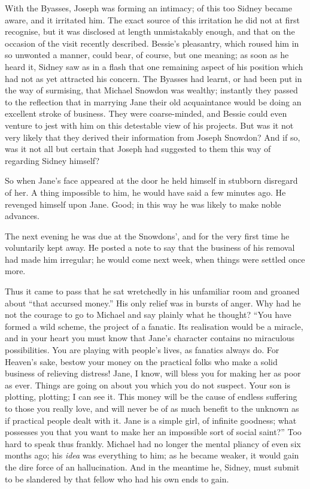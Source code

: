 With the Byasses, Joseph was forming an {}intimacy; of this too Sidney
became aware, and it irritated him. The exact source of this irritation
he did not at first recognise, but it was disclosed at length
unmistakably enough, and that on the occasion of the visit recently
described. Bessie's pleasantry, which roused him in so unwonted a
manner, could bear, of course, but one meaning; as soon as he heard it,
Sidney saw as in a flash that one remaining aspect of his position which
had not as yet attracted his concern. The Byasses had learnt, or had
been put in the way of surmising, that Michael Snowdon was wealthy;
instantly they passed to the reflection that in marrying Jane their old
acquaintance would be doing an excellent stroke of business. They were
coarse-minded, and Bessie could even venture to jest with him on this
detestable view of his projects. But was it not very likely that they
derived their information from Joseph Snowdon? And if so, was it not all
but certain that Joseph had suggested to them this way of regarding
Sidney himself?

{}So when Jane's face appeared at the door he held himself in stubborn
disregard of her. A thing impossible to him, he would have said a few
minutes ago. He revenged himself upon Jane. Good; in this way he was
likely to make noble advances.

The next evening he was due at the Snowdons', and for the very first
time he voluntarily kept away. He posted a note to say that the business
of his removal had made him irregular; he would come next week, when
things were settled once more.

Thus it came to pass that he sat wretchedly in his unfamiliar room and
groaned about ``that accursed money.'' His only relief was in bursts of
anger. Why had he not the courage to go to Michael and say plainly what
he thought? ``You have formed a wild scheme, the project of a fanatic.
Its realisation would be a miracle, and in your heart you must know that
Jane's character contains no miraculous possibilities. You are playing
with people's lives, as fanatics always do. For Heaven's sake, bestow
your money on the {}practical folks who make a solid business of
relieving distress! Jane, I know, will bless you for making her as poor
as ever. Things are going on about you which you do not suspect. Your
son is plotting, plotting; I can see it. This money will be the cause of
endless suffering to those you really love, and will never be of as much
benefit to the unknown as if practical people dealt with it. Jane is a
simple girl, of infinite goodness; what possesses you that you want to
make her an impossible sort of social saint?'' Too hard to speak thus
frankly. Michael had no longer the mental pliancy of even six months
ago; his \emph{idea} was everything to him; as he became weaker, it
would gain the dire force of an hallucination. And in the meantime he,
Sidney, must submit to be slandered by that fellow who had his own ends
to gain.

